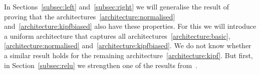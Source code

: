 
In Sections~\ref{subsec:left} and~\ref{subsec:right} we will generalise the result of~\cite{grohewl} proving that the architectures~\eqref{architecture:normalised} and~\eqref{architecture:kipfbiased} also have these properties. For this we will introduce a uniform architecture that captures all architectures~\eqref{architecture:basic}, \eqref{architecture:normalised} and~\eqref{architecture:kipfbiased}. We do not know whether a similar result holds for the remaining architecture~\eqref{architecture:kipf}.
But first, in Section~\ref{subsec:relu} we strengthen one of the results from~\cite{grohewl}.

